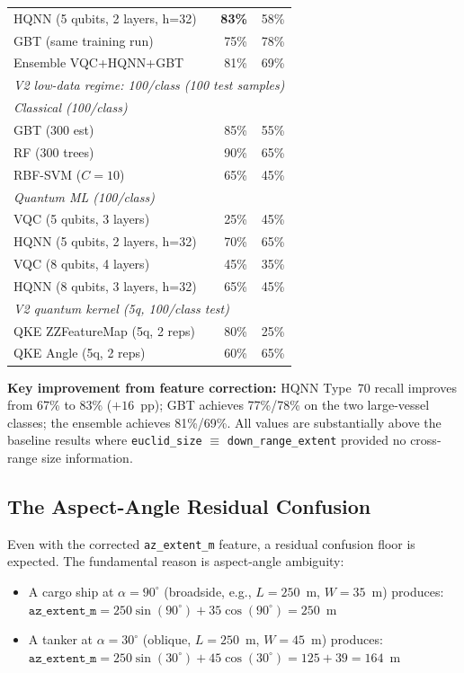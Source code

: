 \documentclass[journal]{IEEEtran}
\begin{document}
\begin{table}[H]
\begin{tabular}{p{7.5cm}rr}
HQNN (5 qubits, 2 layers, h=32)   & \textbf{83\%} & 58\% \\
GBT  (same training run)          & 75\% & 78\% \\
Ensemble VQC+HQNN+GBT             & 81\% & 69\% \\
\midrule
\multicolumn{3}{l}{\textit{V2 low-data regime: 100/class (100 test samples)}} \\
\multicolumn{3}{l}{\quad\textit{Classical (100/class)}} \\
GBT (300 est)                     & 85\% & 55\% \\
RF  (300 trees)                   & 90\% & 65\% \\
RBF-SVM ($C=10$)                  & 65\% & 45\% \\
\multicolumn{3}{l}{\quad\textit{Quantum ML (100/class)}} \\
VQC  (5 qubits, 3 layers)         & 25\% & 45\% \\
HQNN (5 qubits, 2 layers, h=32)   & 70\% & 65\% \\
VQC  (8 qubits, 4 layers)         & 45\% & 35\% \\
HQNN (8 qubits, 3 layers, h=32)   & 65\% & 45\% \\
\midrule
\multicolumn{3}{l}{\textit{V2 quantum kernel (5q, 100/class test)}} \\
QKE ZZFeatureMap (5q, 2 reps)     & 80\% & 25\% \\
QKE Angle (5q, 2 reps)            & 60\% & 65\% \\
\bottomrule
\end{tabular}
\end{table}

\noindent\textbf{Key improvement from feature correction:}
HQNN Type~70 recall improves from 67\% to 83\% ($+16$~pp);
GBT achieves 77\%/78\% on the two large-vessel classes;
the ensemble achieves 81\%/69\%.
All values are substantially above the baseline results where
\texttt{euclid\_size} $\equiv$ \texttt{down\_range\_extent} provided
no cross-range size information.

\subsection{The Aspect-Angle Residual Confusion}
\label{sec:aspect_residual}

Even with the corrected \texttt{az\_extent\_m} feature, a residual confusion
floor is expected. The fundamental reason is aspect-angle ambiguity:

\begin{itemize}
  \item A cargo ship at $\alpha = 90^\circ$ (broadside, e.g., $L=250$~m,
        $W=35$~m) produces:
        $\texttt{az\_extent\_m} = 250\sin(90^\circ) + 35\cos(90^\circ) = 250$~m
  \item A tanker at $\alpha = 30^\circ$ (oblique, $L=250$~m, $W=45$~m) produces:
        $\texttt{az\_extent\_m} = 250\sin(30^\circ) + 45\cos(30^\circ) = 125 + 39 = 164$~m
\end{itemize}
\end{document}
